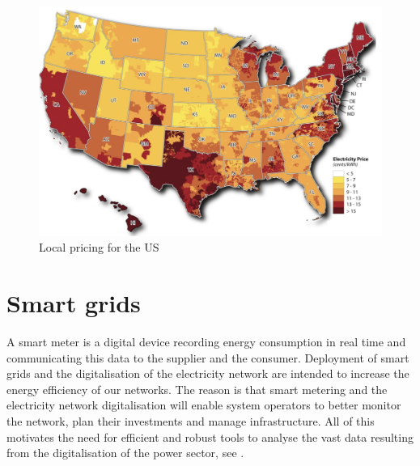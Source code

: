 \begin{figure}[!ht]
    \includegraphics[width=\textwidth]{images/us_local.png}
    \caption[Local pricing for the US]{Local pricing for the US }
    \label{fig:us_local}
\end{figure}

\section{Smart grids}
A smart meter is a digital device recording energy consumption in real time and communicating this data to the supplier and the consumer.
Deployment of smart grids and the digitalisation of the electricity network are intended to increase the energy efficiency of our networks.
The reason is that smart metering and the electricity network digitalisation  will enable system operators to better monitor the network, plan their investments and manage infrastructure. 
All of this motivates the need for efficient and robust tools to analyse the vast data resulting from the digitalisation of the power sector, see \cite{declean,andreadou2016telecommunication}.



